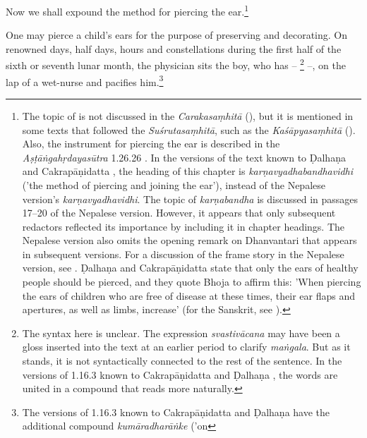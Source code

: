 \begin{translation}    
    
    \item [1] Now we shall expound the method for piercing the ear.\footnote{The
topic of   is not discussed in the
\emph{Carakasaṃhitā} (\cite[IB, 326, n.\,175]{meul-hist}), but it is mentioned
in some texts that followed the \emph{Suśrutasaṃhitā}, such as the
\emph{Kaśāpyasaṃhitā} (\cite[IIA, 30]{meul-hist}). Also, the instrument for
piercing the ear is described in the \emph{Aṣṭāṅgahṛdayasūtra} 1.26.26
\citep[153]{kunt-1902}. In the versions of the text known to Ḍalhaṇa
\citep[76]{vulgate} and Cakrapāṇidatta \citep[125]{acar-1939}, the heading of
this chapter is \emph{karṇavyadhabandhavidhi} ('the method of piercing and
joining the ear'), instead of the Nepalese version's \emph{karṇavyadhavidhi}.
The topic of \emph{karṇabandha} is discussed in passages 17--20 of the
Nepalese version. However, it appears that only subsequent redactors reflected
its importance by including it in chapter headings. The Nepalese version also
omits the opening remark on Dhanvantari that appears in subsequent versions.
For a discussion of the frame story in the Nepalese version, see
\cite{birc-2021}. Ḍalhaṇa \citep[76]{vulgate} and Cakrapāṇidatta
\citep[125]{acar-1939} state that only the ears of healthy people should be
pierced, and they quote Bhoja to affirm this: 'When piercing the ears of
children who are free of disease at these times, their ear flaps and
apertures, as well as limbs, increase' (for the Sanskrit, see
\cite[76]{vulgate}).} \item [2] One may pierce a child's ears for the purpose
of preserving and decorating. On renowned days, half days, hours and
constellations during the first half of the sixth or seventh lunar month, the
physician sits the boy, who has  --
\footnote{The syntax here is unclear.
The expression \emph{svastivācana} may have been a gloss inserted into the
text at an earlier period to clarify \emph{maṅgala}.  But as it stands, it is
not syntactically connected to the rest of the sentence. In the versions of
1.16.3 known to Cakrapāṇidatta \citep[126]{acar-1939} and Ḍalhaṇa
\citep[76]{vulgate}, the words are united in a compound that reads more
naturally.} --, on the lap of a wet-nurse and pacifies him.\footnote{The
versions of 1.16.3 known to Cakrapāṇidatta \citep[126]{acar-1939} and Ḍalhaṇa
\citep[76]{vulgate} have the additional compound \emph{kumāradharāṅke} ('on
}
\end{translation}
